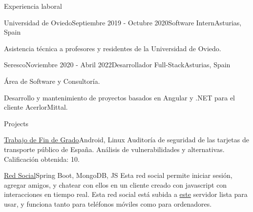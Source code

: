 \documentclass{resume} %
\begin{document}
\begin{rSection}{Experiencia laboral}


\begin{rSubsection}{Universidad de Oviedo}{Septiembre 2019 - Octubre 2020}{Software Intern}{Asturias, Spain}
\item Asistencia técnica a profesores y residentes de la Universidad de Oviedo.
\end{rSubsection}

\begin{rSubsection}{Seresco}{Noviembre 2020 - Abril 2022}{Desarrollador Full-Stack}{Asturias, Spain}
\item Área de Software y Consultoría.
\item Desarrollo y mantenimiento de proyectos basados en Angular y .NET para el cliente AcerlorMittal.
\end{rSubsection}

\end{rSection}


\begin{rSection}{Projects}


\begin{rSubsection}{\href{https://github.com/alexl0/tfg}{Trabajo de Fin de Grado}}{Android, Linux}{}{}
Auditoría de seguridad de las tarjetas de transporte público de España. Análisis de vulnerabilidades y alternativas.
Calificación obtenida: 10.
\end{rSubsection}

\begin{rSubsection}{\href{https://chatwithyouwant.herokuapp.com}{Red Social}}{Spring Boot, MongoDB, JS}{}{}
Esta red social permite iniciar sesión, agregar amigos, y chatear con ellos en un cliente creado con javascript con interacciones en tiempo real.
Esta red social está subida a \href{https://chatwithyouwant.herokuapp.com}{este} servidor lista para usar, y funciona tanto para teléfonos móviles como para ordenadores.
\end{rSubsection}


\end{rSection}
\end{document}
